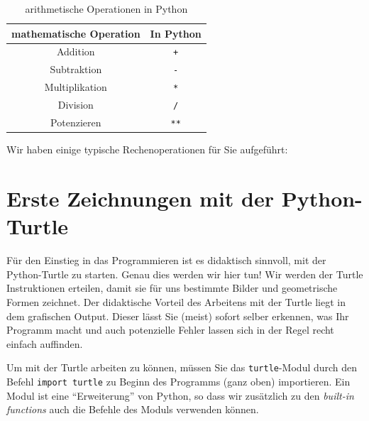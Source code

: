 \begin{myoverview}\label{myoverview:arithm-op}
	\begin{table}[H]
		\centering
		\begin{tabular}{cc}
			\textbf{mathematische Operation} & \textbf{In Python} \\\midrule
			Addition                         & \lstinline|+|      \\\midrule
			Subtraktion                      & \lstinline|-|      \\\midrule
			Multiplikation                   & \lstinline|*|      \\\midrule
			Division                         & \lstinline|/|      \\\midrule
			Potenzieren                      & \lstinline|**|
		\end{tabular}
		\caption{arithmetische Operationen in Python}
		\label{tab:arithm-op}
	\end{table}
\end{myoverview}
\begin{myexample}\label{myexample:basisoperationen}
Wir haben einige typische Rechenoperationen für Sie aufgeführt:

\end{myexample}

\section{Erste Zeichnungen mit der Python-Turtle}
Für den Einstieg in das Programmieren ist es didaktisch sinnvoll, mit der Python-Turtle zu starten. Genau dies werden wir hier tun! Wir werden der Turtle Instruktionen erteilen, damit sie für uns bestimmte Bilder und geometrische Formen zeichnet. Der didaktische Vorteil des Arbeitens mit der Turtle liegt in dem grafischen Output. Dieser lässt Sie (meist) sofort selber erkennen, was Ihr Programm macht und auch potenzielle Fehler lassen sich in der Regel recht einfach auffinden.

Um mit der Turtle arbeiten zu können, müssen Sie das \lstinline|turtle|-Modul durch den Befehl \lstinline|import turtle| zu Beginn des Programms (ganz oben) importieren. Ein Modul ist eine \enquote{Erweiterung} von Python, so dass wir zusätzlich zu den \emph{built-in functions} auch die Befehle des Moduls verwenden können.

